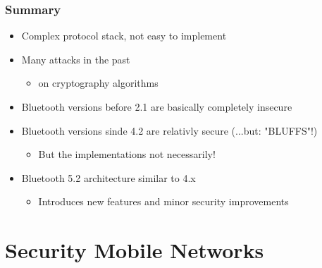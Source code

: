 \subsubsection{Summary}
\begin{itemize}
  \item Complex protocol stack, not easy to implement
  \item Many attacks in the past  
    \begin{itemize}
      \item on cryptography algorithms
    \end{itemize}
  \item Bluetooth versions before 2.1 are basically completely insecure 
  \item Bluetooth versions sinde 4.2 are relativly secure (...but: "BLUFFS"!) 
    \begin{itemize}
      \item But the implementations not necessarily!
    \end{itemize}
  \item Bluetooth 5.2 architecture similar to 4.x 
    \begin{itemize}
      \item Introduces new features and minor security improvements
    \end{itemize}
\end{itemize}

\section{Security Mobile Networks}
